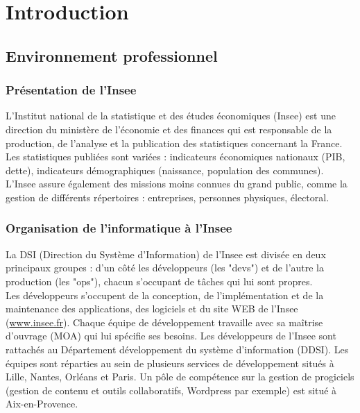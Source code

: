 \documentclass[11pt,fleqn]{book} %
\begin{document}
\pagestyle{fancy} %


\mainmatter
\part{\textcolor{ocre}{Introduction}}
\chapter{Environnement professionnel}
\vspace{-2cm}
\section{Présentation de l'Insee}
L’Institut national de la statistique et des études économiques (Insee) est une direction du ministère de l'économie et des finances qui est responsable de la production, de l'analyse et la publication des statistiques concernant la France. Les statistiques publiées sont variées : indicateurs économiques nationaux (PIB, dette), indicateurs démographiques (naissance, population des communes). L'Insee assure également des missions moins connues du grand public, comme la gestion de différents répertoires : entreprises, personnes physiques, électoral.

\section{Organisation de l'informatique à l'Insee}
La DSI (Direction du Système d'Information) de l’Insee est divisée en deux principaux groupes :  d'un côté les développeurs (les "devs") et de l'autre la production (les "ops"), chacun s'occupant de tâches qui lui sont propres.\\

Les développeurs s'occupent de la conception, de l'implémentation et de la maintenance des applications, des logiciels et du site WEB de l'Insee (\url{www.insee.fr}). Chaque équipe de développement travaille avec sa maîtrise d'ouvrage (MOA) qui lui spécifie ses besoins. Les développeurs de l’Insee sont rattachés au Département développement du système d’information (DDSI). Les équipes sont réparties au sein de plusieurs services de développement situés à Lille, Nantes,  Orléans et Paris. Un pôle de compétence sur la gestion de progiciels (gestion de contenu et outils collaboratifs, Wordpress par exemple) est situé à Aix-en-Provence.\\
\end{document}
